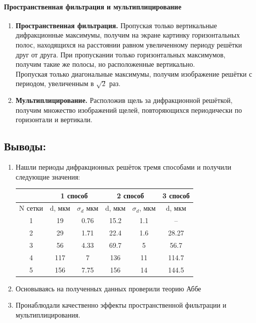 \documentclass[a4paper,12pt]{article}
\begin{document}
\paragraph{Пространственная фильтрация и мультиплицирование}
\begin{enumerate}
\itemsep0em
\item
\textbf{Пространственная фильтрация.} Пропуская только вертикальные дифракционные максимумы, получим на экране картинку горизонтальных полос, находящихся на расстоянии равном увеличенному периоду решётки друг от друга. При пропускании только горизонтальных максимумов, получим такие же полосы, но расположенные вертикально.\\ Пропуская только диагональные максимумы, получим изображение решётки с периодом, увеличенным в $\sqrt{2}$ раз. 
\item
\textbf{Мультиплицирование.} Расположив щель за дифракционной решёткой, получим множество изображений щелей, повторяющихся периодически по горизонтали и вертикали.
\end{enumerate}
\subsection*{Выводы:}
\begin{enumerate}
\itemsep0em
\item Нашли периоды дифракционных решёток тремя способами и получили следующие значения:
\begin{table}[h!]
\centering
\begin{tabular}{|c|cc|cc|c|}
\hline
        & \multicolumn{2}{c|}{1 способ}                  & \multicolumn{2}{c|}{2 способ}                   & 3 способ \\ \hline
N сетки & \multicolumn{1}{c|}{d, мкм} & $\sigma_{d}$ мкм & \multicolumn{1}{c|}{d, мкм} & $\sigma_{d}$, мкм & d, мкм   \\ \hline
1       & \multicolumn{1}{c|}{19}     & 0.76             & \multicolumn{1}{c|}{15.2}   & 1.1               & --       \\ \hline
2       & \multicolumn{1}{c|}{29}     & 1.71             & \multicolumn{1}{c|}{22.4}   & 1.6               & 28.27    \\ \hline
3       & \multicolumn{1}{c|}{56}     & 4.33             & \multicolumn{1}{c|}{69.7}   & 5                 & 56.7     \\ \hline
4       & \multicolumn{1}{c|}{117}    & 7                & \multicolumn{1}{c|}{136}    & 11                & 114.7    \\ \hline
5       & \multicolumn{1}{c|}{156}    & 7.75             & \multicolumn{1}{c|}{156}    & 14                & 144.5    \\ \hline
\end{tabular}
\end{table}
\item Основываясь на полученных данных проверили теорию Аббе

\item Пронаблюдали качественно эффекты пространственной фильтрации и мультиплицирования.
\end{enumerate}
\end{document}
